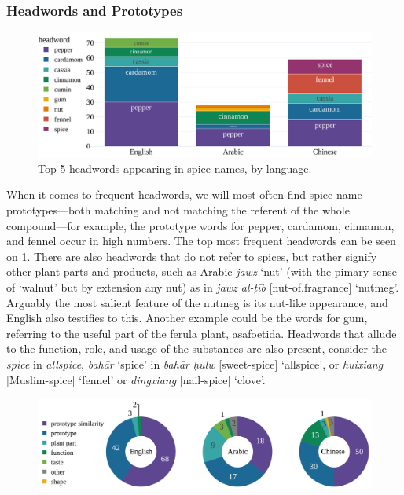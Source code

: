 



\subsubsection{Headwords and Prototypes}

\begin{figure}[ht!]
  \includegraphics[width=\linewidth]{imgs/plots/headword_bar.pdf}
  \caption{Top 5 headwords appearing in spice names, by language.}
  \label{fig:headword_bar}
\end{figure}

When it comes to frequent headwords, we will most often find spice name prototypes---both matching and not matching the referent of the whole compound---for example, the prototype words for pepper, cardamom, cinnamon, and fennel occur in high numbers. The top most frequent headwords can be seen on \cref{fig:headword_bar}. There are also headwords that do not refer to spices, but rather signify other plant parts and products, such as Arabic \textit{jawz} `nut' (with the pimary sense of `walnut' but by extension any nut) as in \textit{jawz al-ṭīb} [nut-of.fragrance] `nutmeg'. Arguably the most salient feature of the nutmeg is its nut-like appearance, and English also testifies to this. Another example could be the words for gum, referring to the useful part of the ferula plant, asafoetida. Headwords that allude to the function, role, and usage of the substances are also present, consider the \textit{spice} in \textit{allspice}, \textit{bahār} `spice' in \textit{bahār ḥulw}	[sweet-spice] `allspice', or \textit{huixiang} [Muslim-spice] `fennel' or \textit{dingxiang} [nail-spice] `clove'.

\begin{figure}[ht!]
  \includegraphics[width=\linewidth]{imgs/plots/headword_type_tripie.pdf}
  \caption{}
  \label{fig:headword_type_tripie}
\end{figure}


